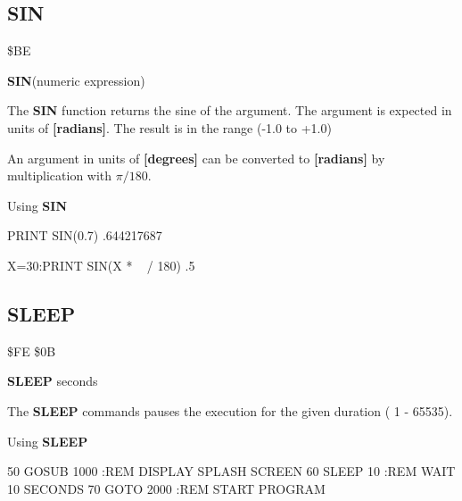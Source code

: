
\newpage
\subsection{SIN}
\begin{description}[leftmargin=3cm,style=nextline]
\item [Token:] \$BE
\item [Format:] {\bf SIN}(numeric expression)
\item [Usage:] The {\bf SIN} function returns the sine of the
               argument.
               The argument is expected in units of {\bf [radians]}.
               The result is in the range (-1.0 to +1.0)

\item [Remarks:] An argument in units of {\bf [degrees]}
                 can be converted to {\bf [radians]}
               by multiplication with $\pi/180$.
\item [Example:] Using {\bf SIN}
\begin{screenoutput}
  PRINT SIN(0.7)
   .644217687

  X=30:PRINT SIN(X * ~ / 180)
   .5
\end{screenoutput}
\end{description}


\newpage
\subsection{SLEEP}
\begin{description}[leftmargin=3cm,style=nextline]
\item [Token:] \$FE \$0B
\item [Format:] {\bf SLEEP} seconds
\item [Usage:] The {\bf SLEEP} commands pauses the execution
               for the given duration ( 1 - 65535).

\item [Example:] Using {\bf SLEEP}
\begin{screenoutput}
50 GOSUB 1000 :REM DISPLAY SPLASH SCREEN
60 SLEEP 10   :REM WAIT 10 SECONDS
70 GOTO  2000 :REM START PROGRAM
\end{screenoutput}
\end{description}


\newpage
